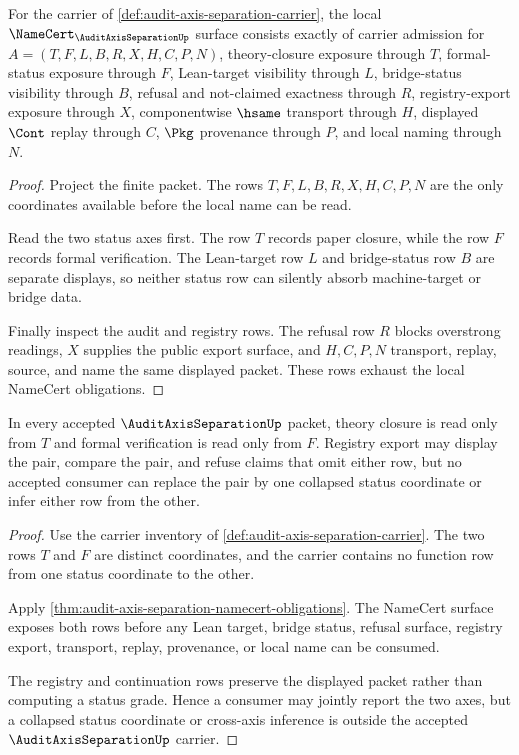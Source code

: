 \begin{theorem}
\label{thm:audit-axis-separation-namecert-obligations}
For the carrier of \autoref{def:audit-axis-separation-carrier}, the local $\NameCert_{\AuditAxisSeparationUp}$ surface consists exactly of carrier admission for $A=(T,F,L,B,R,X,H,C,P,N)$, theory-closure exposure through $T$, formal-status exposure through $F$, Lean-target visibility through $L$, bridge-status visibility through $B$, refusal and not-claimed exactness through $R$, registry-export exposure through $X$, componentwise $\hsame$ transport through $H$, displayed $\Cont$ replay through $C$, $\Pkg$ provenance through $P$, and local naming through $N$.
\end{theorem}
\begin{proof}
Project the finite packet. The rows $T,F,L,B,R,X,H,C,P,N$ are the only coordinates available before the local name can be read.

Read the two status axes first. The row $T$ records paper closure, while the row $F$ records formal verification. The Lean-target row $L$ and bridge-status row $B$ are separate displays, so neither status row can silently absorb machine-target or bridge data.

Finally inspect the audit and registry rows. The refusal row $R$ blocks overstrong readings, $X$ supplies the public export surface, and $H,C,P,N$ transport, replay, source, and name the same displayed packet. These rows exhaust the local NameCert obligations.
\end{proof}

\begin{theorem}
\label{thm:audit-axis-separation-noncollapse}
In every accepted $\AuditAxisSeparationUp$ packet, theory closure is read only from $T$ and formal verification is read only from $F$. Registry export may display the pair, compare the pair, and refuse claims that omit either row, but no accepted consumer can replace the pair by one collapsed status coordinate or infer either row from the other.
\end{theorem}
\begin{proof}
Use the carrier inventory of \autoref{def:audit-axis-separation-carrier}. The two rows $T$ and $F$ are distinct coordinates, and the carrier contains no function row from one status coordinate to the other.

Apply \autoref{thm:audit-axis-separation-namecert-obligations}. The NameCert surface exposes both rows before any Lean target, bridge status, refusal surface, registry export, transport, replay, provenance, or local name can be consumed.

The registry and continuation rows preserve the displayed packet rather than computing a status grade. Hence a consumer may jointly report the two axes, but a collapsed status coordinate or cross-axis inference is outside the accepted $\AuditAxisSeparationUp$ carrier.
\end{proof}

